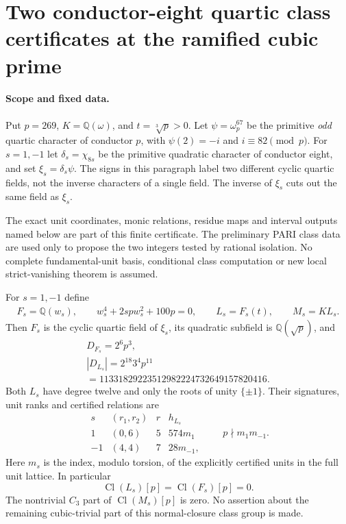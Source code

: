 \section{Two conductor-eight quartic class certificates at the ramified cubic prime}
\label{sec:quadratic8-quartic-class-certificates}

\paragraph{Scope and fixed data.}
Put $p=269$, $K=\mathbb Q(\omega)$, and $t=\sqrt[3]p>0$.
Let $\psi=\omega_p^{67}$ be the primitive \emph{odd} quartic
character of conductor $p$, with $\psi(2)=-i$ and
$i\equiv82\pmod p$.
For $s=1,-1$ let $\delta_s=\chi_{8s}$ be the primitive quadratic
character of conductor eight, and set $\xi_s=\delta_s\psi$.
The signs in this paragraph label two different cyclic quartic
fields, not the inverse characters of a single field.
The inverse of $\xi_s$ cuts out the same field as $\xi_s$.

The exact unit coordinates, monic relations, residue maps and
interval outputs named below are part of this finite certificate.
The preliminary PARI class data are used only to propose the two
integers tested by rational isolation.
No complete fundamental-unit basis, conditional class computation
or new local strict-vanishing theorem is assumed.

\begin{theorem}
\label{AC-G158-class}
For $s=1,-1$ define
\[
 \begin{gathered}
 F_s=\mathbb Q(w_s),\qquad
 w_s^4+2spw_s^2+100p=0,\qquad
 L_s=F_s(t),\qquad M_s=KL_s.
 \end{gathered}
 \tag{Q8QC.1}
\]
Then $F_s$ is the cyclic quartic field of $\xi_s$, its quadratic
subfield is $\mathbb Q(\sqrt p)$, and
\[
 \begin{gathered}
 D_{F_s}=2^6p^3,\\
 |D_{L_s}|=2^{18}3^4p^{11}\\
 =11331829223512982224732649157820416.
 \end{gathered}
 \tag{Q8QC.2}
\]
Both $L_s$ have degree twelve and only the roots of unity $\{\pm1\}$.
Their signatures, unit ranks and certified relations are
\[
 \begin{array}{c|c|c|c}
 s&(r_1,r_2)&r&h_{L_s}\\ \hline
 1&(0,6)&5&574m_1\\
 -1&(4,4)&7&28m_{-1},
 \end{array}
 \qquad p\nmid m_1m_{-1}.
 \tag{Q8QC.3}
\]
Here $m_s$ is the index, modulo torsion, of the explicitly
certified units in the full unit lattice.
In particular
\[
             \operatorname{Cl}(L_s)[p]=
             \operatorname{Cl}(F_s)[p]=0.
 \tag{Q8QC.4}
\]
The nontrivial $C_3$ part of $\operatorname{Cl}(M_s)[p]$ is zero.
No assertion about the remaining cubic-trivial part of this
normal-closure class group is made.
\end{theorem}

